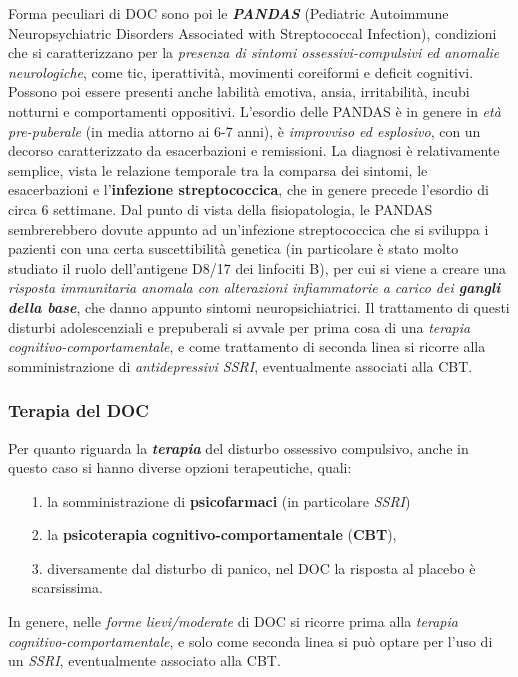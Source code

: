 Forma peculiari di DOC sono poi le \textbf{\emph{PANDAS}} (Pediatric
Autoimmune Neuropsychiatric Disorders Associated with Streptococcal
Infection), condizioni che si caratterizzano per la \emph{presenza di
sintomi ossessivi-compulsivi ed anomalie neurologiche}, come tic,
iperattività, movimenti coreiformi e deficit cognitivi. Possono poi
essere presenti anche labilità emotiva, ansia, irritabilità, incubi
notturni e comportamenti oppositivi. L'esordio delle PANDAS è in genere
in \emph{età pre-puberale} (in media attorno ai 6-7 anni), è
\emph{improvviso ed esplosivo}, con un decorso caratterizzato da
esacerbazioni e remissioni. La diagnosi è relativamente semplice, vista
le relazione temporale tra la comparsa dei sintomi, le esacerbazioni e
l'\textbf{infezione streptococcica}, che in genere precede l'esordio di
circa 6 settimane. Dal punto di vista della fisiopatologia, le PANDAS
sembrerebbero dovute appunto ad un'infezione streptococcica che si
sviluppa i pazienti con una certa suscettibilità genetica (in
particolare è stato molto studiato il ruolo dell'antigene D8/17 dei
linfociti B), per cui si viene a creare una \emph{risposta immunitaria
anomala con alterazioni infiammatorie a carico dei \textbf{gangli della
base}}, che danno appunto sintomi neuropsichiatrici. Il trattamento di
questi disturbi adolescenziali e prepuberali si avvale per prima cosa di
una \emph{terapia cognitivo-comportamentale}, e come trattamento di
seconda linea si ricorre alla somministrazione di \emph{antidepressivi
SSRI}, eventualmente associati alla CBT.

\subsubsection{Terapia del DOC}

Per quanto riguarda la \textbf{\emph{terapia}} del disturbo ossessivo
compulsivo, anche in questo caso si hanno diverse opzioni terapeutiche,
quali:

\begin{itemize}
\item[1.]
  la somministrazione di \textbf{psicofarmaci} (in particolare
  \emph{SSRI})
\item[2.]
  la \textbf{psicoterapia} \textbf{cognitivo-comportamentale}
  (\textbf{CBT}),
\item[3.]
  diversamente dal disturbo di panico, nel DOC la risposta al placebo è
  scarsissima.
\end{itemize}

In genere, nelle \emph{forme lievi/moderate} di DOC si ricorre prima
alla \emph{terapia cognitivo-comportamentale}, e solo come seconda linea
si può optare per l'uso di un \emph{SSRI}, eventualmente associato alla
CBT.

